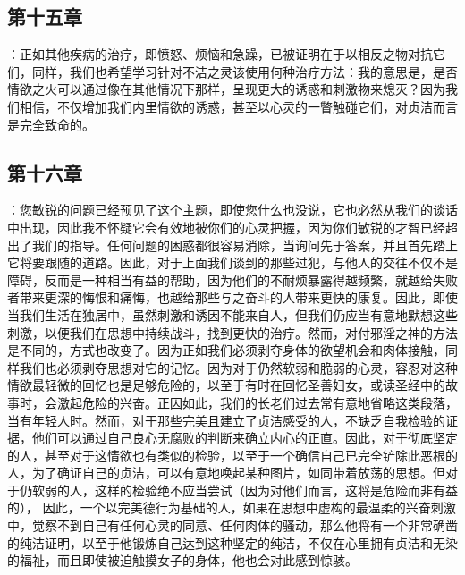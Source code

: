 
\subsection{第十五章}

\par

：正如其他疾病的治疗，即愤怒、烦恼和急躁，已被证明在于以相反之物对抗它们，同样，我们也希望学习针对不洁之灵该使用何种治疗方法：我的意思是，是否情欲之火可以通过像在其他情况下那样，呈现更大的诱惑和刺激物来熄灭？因为我们相信，不仅增加我们内里情欲的诱惑，甚至以心灵的一瞥触碰它们，对贞洁而言是完全致命的。\par


\subsection{第十六章}

\par

：您敏锐的问题已经预见了这个主题，即使您什么也没说，它也必然从我们的谈话中出现，因此我不怀疑它会有效地被你们的心灵把握，因为你们敏锐的才智已经超出了我们的指导。任何问题的困惑都很容易消除，当询问先于答案，并且首先踏上它将要跟随的道路。因此，对于上面我们谈到的那些过犯，与他人的交往不仅不是障碍，反而是一种相当有益的帮助，因为他们的不耐烦暴露得越频繁，就越给失败者带来更深的悔恨和痛悔，也越给那些与之奋斗的人带来更快的康复。因此，即使当我们生活在独居中，虽然刺激和诱因不能来自人，但我们仍应当有意地默想这些刺激，以便我们在思想中持续战斗，找到更快的治疗。然而，对付邪淫之神的方法是不同的，方式也改变了。因为正如我们必须剥夺身体的欲望机会和肉体接触，同样我们也必须剥夺思想对它的记忆。因为对于仍然软弱和脆弱的心灵，容忍对这种情欲最轻微的回忆也是足够危险的，以至于有时在回忆圣善妇女，或读圣经中的故事时，会激起危险的兴奋。正因如此，我们的长老们过去常有意地省略这类段落，当有年轻人时。然而，对于那些完美且建立了贞洁感受的人，不缺乏自我检验的证据，他们可以通过自己良心无腐败的判断来确立内心的正直。因此，对于彻底坚定的人，甚至对于这情欲也有类似的检验，以至于一个确信自己已完全铲除此恶根的人，为了确证自己的贞洁，可以有意地唤起某种图片，如同带着放荡的思想。但对于仍软弱的人，这样的检验绝不应当尝试（因为对他们而言，这将是危险而非有益的）， 因此，一个以完美德行为基础的人，如果在思想中虚构的最温柔的兴奋刺激中，觉察不到自己有任何心灵的同意、任何肉体的骚动，那么他将有一个非常确凿的纯洁证明，以至于他锻炼自己达到这种坚定的纯洁，不仅在心里拥有贞洁和无染的福祉，而且即使被迫触摸女子的身体，他也会对此感到惊骇。\par

